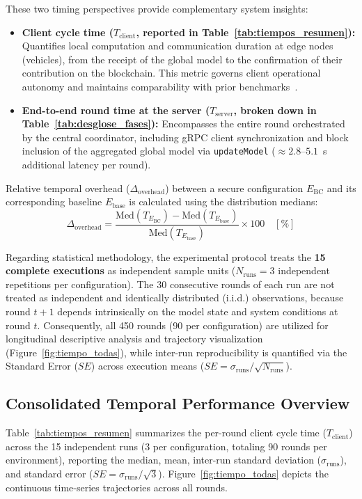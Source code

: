 These two timing perspectives provide complementary system insights:
\begin{itemize}
    \item \textbf{Client cycle time ($T_{\text{client}}$, reported in Table~\ref{tab:tiempos_resumen}):} Quantifies local computation and communication duration at edge nodes (vehicles), from the receipt of the global model to the confirmation of their contribution on the blockchain. This metric governs client operational autonomy and maintains comparability with prior benchmarks~\cite{cloudlabaia_flblockchain}.
    \item \textbf{End-to-end round time at the server ($T_{\text{server}}$, broken down in Table~\ref{tab:desglose_fases}):} Encompasses the entire round orchestrated by the central coordinator, including gRPC client synchronization and block inclusion of the aggregated global model via \texttt{updateModel} ($\approx 2.8\text{--}5.1$~s additional latency per round).
\end{itemize}

Relative temporal overhead ($\Delta_{\text{overhead}}$) between a secure configuration $E_{\text{BC}}$ and its corresponding baseline $E_{\text{base}}$ is calculated using the distribution medians:
\begin{equation}
\Delta_{\text{overhead}} = \frac{\text{Med}(T_{E_{\text{BC}}}) - \text{Med}(T_{E_{\text{base}}})}{\text{Med}(T_{E_{\text{base}}})} \times 100 \quad [\%] \label{eq:overhead}
\end{equation}

Regarding statistical methodology, the experimental protocol treats the \textbf{15 complete executions} as independent sample units ($N_{\text{runs}} = 3$ independent repetitions per configuration). The 30 consecutive rounds of each run are not treated as independent and identically distributed (i.i.d.) observations, because round $t+1$ depends intrinsically on the model state and system conditions at round $t$. Consequently, all 450 rounds (90 per configuration) are utilized for longitudinal descriptive analysis and trajectory visualization (Figure~\ref{fig:tiempo_todas}), while inter-run reproducibility is quantified via the Standard Error ($SE$) across execution means ($SE = \sigma_{\text{runs}} / \sqrt{N_{\text{runs}}}$).

\subsection{Consolidated Temporal Performance Overview}
Table~\ref{tab:tiempos_resumen} summarizes the per-round client cycle time ($T_{\text{client}}$) across the 15 independent runs (3 per configuration, totaling 90 rounds per environment), reporting the median, mean, inter-run standard deviation ($\sigma_{\text{runs}}$), and standard error ($SE = \sigma_{\text{runs}} / \sqrt{3}$). Figure~\ref{fig:tiempo_todas} depicts the continuous time-series trajectories across all rounds.

